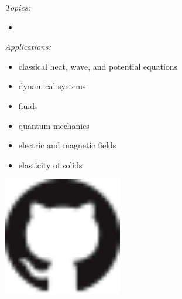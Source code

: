 \documentclass[12pt]{amsart}
\begin{document}
\bigskip \noindent 
\begin{minipage}[t]{0.55\textwidth} \emph{Topics:}
\begin{itemize}
\item 
\end{itemize}

\bigskip
\emph{Applications:}
\begin{itemize}
\item classical heat, wave, and potential equations
\item dynamical systems
\item fluids
\item quantum mechanics
\item electric and magnetic fields
\item elasticity of solids
\end{itemize}
\end{minipage}
\begin{minipage}[t]{0.45\textwidth}
\smallskip

\centering
\includegraphics[height=52mm]{../../images/GitHub-Mark-32px.png}
\end{minipage}
\end{document}
